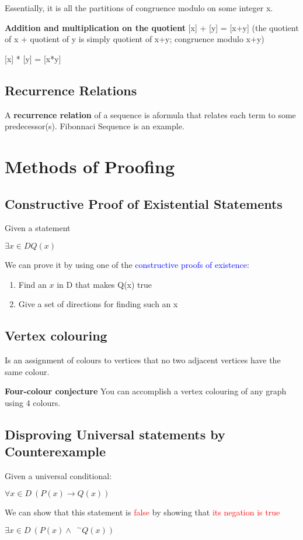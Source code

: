 \documentclass{article}
\newcommand{\negation}{${\phantom{0}}^\sim$}
\newcommand{\sub}[1]{\vspace{10pt}\textbf{#1}}
\newcommand{\sbreak}{\vspace{10pt}}
\begin{document}
Essentially, it is all the partitions of congruence modulo on some integer x.

\sub{Addition and multiplication on the quotient}
[x] + [y] = [x+y]
(the quotient of x + quotient of y is simply quotient of x+y; congruence modulo x+y)

\sbreak

[x] * [y] = [x*y]

\subsection{Recurrence Relations}
A \textbf{recurrence relation} of a sequence is aformula that relates each term to some predecessor(s). Fibonnaci Sequence is an example.

\section{Methods of Proofing}
\subsection{Constructive Proof of Existential Statements}
Given a statement
\begin{center}
    $\exists x \in D Q(x)$
\end{center}
We can prove it by using one of the \textcolor{blue}{constructive proofs of existence}:
\begin{enumerate}
    \item Find an $x$ in D that makes Q(x) true
    \item Give a set of directions for finding such an x
\end{enumerate}


\subsection{Vertex colouring}
Is an assignment of colours to vertices that no two adjacent vertices have the same colour.

\sub{Four-colour conjecture}
You can accomplish a vertex colouring of any graph using 4 colours.


\subsection{Disproving Universal statements by Counterexample}
Given a universal conditional:
\begin{center}
    $\forall x \in D\ (P(x)\rightarrow Q(x))$
\end{center}
We can show that this statement is \textcolor{red}{false} by showing that \textcolor{red}{its negation is true}
\begin{center}
    $\exists x \in D\ (P(x)\wedge \text{\negation} Q(x))$
\end{center}
\end{document}
